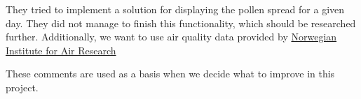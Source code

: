 They tried to implement a solution for displaying the pollen spread for a given day. They did not manage to finish this functionality, which should be researched further. Additionally, we want to use air quality data provided by \href{http://luftkvalitet.info}{Norwegian Institute for Air Research} 

These comments are used as a basis when we decide what to improve in this project. 







